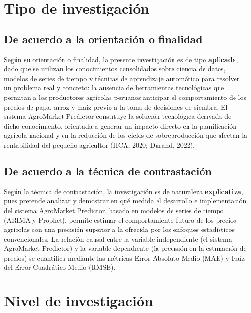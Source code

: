 \documentclass[12pt, a4paper]{report}
\begin{document}
\section{Tipo de investigación}

\subsection{De acuerdo a la orientación o finalidad}

Según su orientación o finalidad, la presente investigación es de tipo \textbf{aplicada}, dado que se utilizan los conocimientos consolidados sobre ciencia de datos, modelos de series de tiempo y técnicas de aprendizaje automático para resolver un problema real y concreto: la ausencia de herramientas tecnológicas que permitan a los productores agrícolas peruanos anticipar el comportamiento de los precios de papa, arroz y maíz previo a la toma de decisiones de siembra. El sistema AgroMarket Predictor constituye la solución tecnológica derivada de dicho conocimiento, orientada a generar un impacto directo en la planificación agrícola nacional y en la reducción de los ciclos de sobreproducción que afectan la rentabilidad del pequeño agricultor (IICA, 2020; Durand, 2022).

\subsection{De acuerdo a la técnica de contrastación}

Según la técnica de contrastación, la investigación es de naturaleza \textbf{explicativa}, pues pretende analizar y demostrar en qué medida el desarrollo e implementación del sistema AgroMarket Predictor, basado en modelos de series de tiempo (ARIMA y Prophet), permite estimar el comportamiento futuro de los precios agrícolas con una precisión superior a la ofrecida por los enfoques estadísticos convencionales. La relación causal entre la variable independiente (el sistema AgroMarket Predictor) y la variable dependiente (la precisión en la estimación de precios) se cuantifica mediante las métricas Error Absoluto Medio (MAE) y Raíz del Error Cuadrático Medio (RMSE).

\section{Nivel de investigación}
\end{document}

